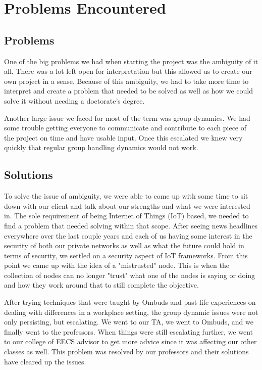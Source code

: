 \documentclass[draftclsnofoot, onecolumn, compsoc, 10pt]{IEEEtran}
\begin{document}
\section{Problems Encountered}
\subsection{Problems}
One of the big problems we had when starting the project was the ambiguity of it all. There was a lot left open for interpretation but this allowed us to create our own project in a sense. Because of this ambiguity, we had to take more time to interpret and create a problem that needed to be solved as well as how we could solve it without needing a doctorate's degree.

Another large issue we faced for most of the term was group dynamics. We had some trouble getting everyone to communicate and contribute to each piece of the project on time and have usable input. Once this escalated we knew very quickly that regular group handling dynamics would not work.

\subsection{Solutions}
To solve the issue of ambiguity, we were able to come up with some time to sit down with our client and talk about our strengths and what we were interested in. The sole requirement of being Internet of Things (IoT) based, we needed to find a problem that needed solving within that scope. After seeing news headlines everywhere over the last couple years and each of us having some interest in the security of both our private networks as well as what the future could hold in terms of security, we settled on a security aspect of IoT frameworks. From this point we came up with the idea of a "mistrusted" node. This is when the collection of nodes can no longer "trust" what one of the nodes is saying or doing and how they work around that to still complete the objective.

After trying techniques that were taught by Ombuds and past life experiences on dealing with differences in a workplace setting, the group dynamic issues were not only persisting, but escalating. We went to our TA, we went to Ombuds, and we finally went to the professors. When things were still escalating further, we went to our college of EECS advisor to get more advice since it was affecting our other classes as well. This problem was resolved by our professors and their solutions have cleared up the issues. 
\end{document}
